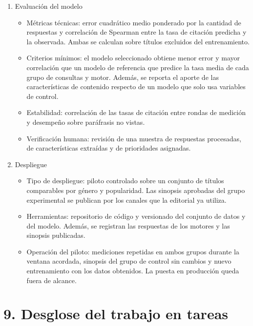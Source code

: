 \documentclass[
11pt, %
codirector, %
]{charter}
\begin{document}
\begin{enumerate}
	\item Evaluación del modelo
	\begin{itemize}
		\item Métricas técnicas: error cuadrático medio ponderado por la cantidad de respuestas y correlación de Spearman entre la tasa de citación predicha y la observada. Ambas se calculan sobre títulos excluidos del entrenamiento.
		\item Criterios mínimos: el modelo seleccionado obtiene menor error y mayor correlación que un modelo de referencia que predice la tasa media de cada grupo de consultas y motor. Además, se reporta el aporte de las características de contenido respecto de un modelo que solo usa variables de control.
		\item Estabilidad: correlación de las tasas de citación entre rondas de medición y desempeño sobre paráfrasis no vistas.
		\item Verificación humana: revisión de una muestra de respuestas procesadas, de características extraídas y de prioridades asignadas.
	\end{itemize}

	\item Despliegue
	\begin{itemize}
		\item Tipo de despliegue: piloto controlado sobre un conjunto de títulos comparables por género y popularidad. Las sinopsis aprobadas del grupo experimental se publican por los canales que la editorial ya utiliza.
		\item Herramientas: repositorio de código y versionado del conjunto de datos y del modelo. Además, se registran las respuestas de los motores y las sinopsis publicadas.
		\item Operación del piloto: mediciones repetidas en ambos grupos durante la ventana acordada, sinopsis del grupo de control sin cambios y nuevo entrenamiento con los datos obtenidos. La puesta en producción queda fuera de alcance.
	\end{itemize}
\end{enumerate}

\section{9. Desglose del trabajo en tareas}
\label{sec:wbs}
\end{document}

